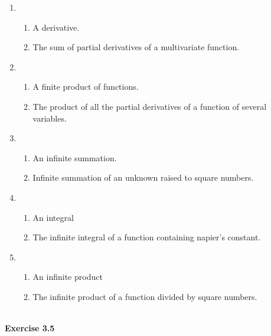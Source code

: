 \documentclass{article}
\begin{document}
\begin{enumerate}
\begin{enumerate}[label=\roman*]
\end{enumerate}
	\item 
\begin{enumerate}[label=\roman*]
	\item  A derivative.
	\item  The sum of partial derivatives of a multivariate function.
\end{enumerate}
	\item 
\begin{enumerate}[label=\roman*]
	\item  A finite product of functions.
	\item  The product of all the partial derivatives of a function of several variables.
\end{enumerate}
	\item 
\begin{enumerate}[label=\roman*]
	\item  An infinite summation.
	\item  Infinite summation of an unknown raised to square numbers.
\end{enumerate}
	\item 
\begin{enumerate}[label=\roman*]
	\item  An integral
	\item  The infinite integral of a function containing napier's constant.
\end{enumerate}
	\item 
\begin{enumerate}[label=\roman*]
	\item  An infinite product
	\item  The infinite product of a function divided by square numbers.
\end{enumerate}
\end{enumerate}
\text{}\\
\textbf{\large\color{blue} Exercise 3.5}
\end{document}
